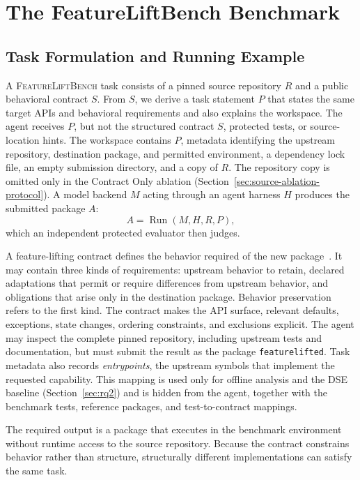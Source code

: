 \documentclass[acmsmall,screen,review,anonymous]{acmart}
\newcommand{\flb}{\textsc{FeatureLiftBench}\xspace}
\begin{document}
\section{The FeatureLiftBench Benchmark}
\label{sec:benchmark}

\subsection{Task Formulation and Running Example}
\label{sec:formulation}

A \flb task consists of a pinned source repository $R$ and a public behavioral
contract $S$. From $S$, we derive a task statement $P$ that states the same
target APIs and behavioral requirements and also explains the workspace. The
agent receives $P$, but not the structured contract $S$, protected tests, or
source-location hints. The workspace contains $P$, metadata identifying the
upstream repository, destination package, and permitted environment, a
dependency lock file, an empty submission directory, and a copy of $R$. The
repository copy is omitted only in the Contract Only ablation
(Section~\ref{sec:source-ablation-protocol}). A model backend $M$ acting
through an agent harness $H$ produces the submitted package $A$:
\begin{equation}
  A = \operatorname{Run}(M,H,R,P),
\end{equation}
which an independent protected evaluator then judges.

A feature-lifting contract defines the behavior required of the new
package~\cite{meyer1992contract}. It may contain three kinds of requirements:
upstream behavior to retain, declared adaptations that permit or require
differences from upstream behavior, and obligations that arise only in the
destination package. Behavior preservation refers to the first kind. The
contract makes the API surface, relevant defaults, exceptions, state changes,
ordering constraints, and exclusions explicit. The agent may inspect the
complete pinned repository, including upstream tests and documentation, but
must submit the result as the package \texttt{featurelifted}. Task metadata also
records \emph{entrypoints}, the upstream symbols that implement the requested
capability. This mapping is used only for offline analysis and the DSE baseline
(Section~\ref{sec:rq2}) and is hidden from the agent, together with the
benchmark tests, reference packages, and test-to-contract mappings.

The required output is a package that executes in the benchmark environment
without runtime access to the source repository. Because the contract constrains
behavior rather than structure, structurally different implementations can
satisfy the same task.
\end{document}
